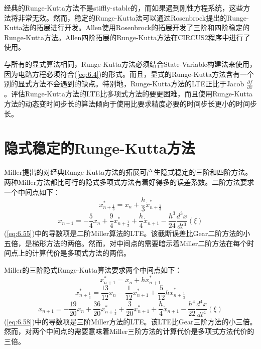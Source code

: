 经典的Runge-Kutta方法不是stiffly-stable的，而如果遇到刚性方程系统，这些方法将非常无效。然而，稳定的Runge-Kutta法可以通过Rosenbrock\cite{ref-71}提出的Runge-Kutta法的拓展进行开发。Allen\cite{ref-72}使用Rosenbrock的拓展开发了三阶和四阶稳定的Runge-Kutta方法。Allen四阶拓展的Runge-Kutta方法在CIRCUS2程序\cite{ref-34}中进行了使用。

与所有的显式算法相同，Runge-Kutta方法必须结合State-Variable构建法来使用，因为电路方程必须符合(\ref{eq:6.4})的形式。而且，显式的Runge-Kutta方法含有一个别的显式方法不会遇到的缺点。特别地，Runge-Kutta方法的LTE正比于Jacob $\frac{\partial f}{\partial x}$。评估Runge-Kutta方法的LTE比多项式方法的要更困难，而且使用Runge-Kutta方法的动态变时间步长的算法倾向于使用比要求精度必要的时间步长更小的时间步长。

\section{隐式稳定的Runge-Kutta方法}
Miller\cite{ref-73,ref-74}提出的对经典Runge-Kutta方法的拓展可产生隐式稳定的三阶和四阶方法。两种Miller方法都比可行的隐式多项式方法有着好得多的误差系数。二阶方法要求一个中间点如下：
\begin{equation}
    x^{*}_{n+\frac{1}{3}} = x_n + \frac{h}{3}\dot{x}^{*}_{n+\frac{1}{3}}
    \label{eq:6.54}
\end{equation}
\begin{equation}
    x_{n+1} = -\frac{5}{4}x_n + \frac{9}{4}x^{*}_{n+\frac{1}{3}} + \frac{h}{4}\dot{x}_{n+1} - \frac{h^3}{24}\frac{d^3x}{dt^3}(\xi)
    \label{eq:6.55}
\end{equation}
(\ref{eq:6.55})中的导数项是二阶Miller算法的LTE。该截断误差比Gear二阶方法的小五倍，是梯形方法的两倍。然而，对中间点的需要暗示着Miller二阶方法在每个时间点上的计算代价是多项式方法的两倍。

Miller的三阶隐式Runge-Kutta算法要求两个中间点如下：
\begin{equation}
    x^{*}_{n+1} = x_n + h\dot{x}^{*}_{n+1}
    \label{eq:6.56}
\end{equation}
\begin{equation}
    x^{*}_{n+\frac{1}{3}} = \frac{13}{12}x_n - \frac{1}{12}x^{*}_{n+1} + \frac{5}{12}h\dot{x}^{*}_{n+\frac{1}{3}}
    \label{eq:6.57}
\end{equation}
\begin{equation}
    x_{n+1} = -\frac{19}{20}x_n + \frac{36}{20}x^{*}_{n+\frac{1}{3}} + \frac{3}{20}x^{*}_{n+1} + \frac{h}{4}\dot{x}_{n+1} - \frac{h^4}{22}\frac{d^4x}{dt^4}(\xi)
    \label{eq:6.58}
\end{equation}
(\ref{eq:6.58})中的导数项是三阶Miller方法的LTE。该LTE比Gear三阶方法的小三倍。然而，对两个中间点的需要意味着Miller三阶方法的计算代价是多项式方法代价的三倍。

